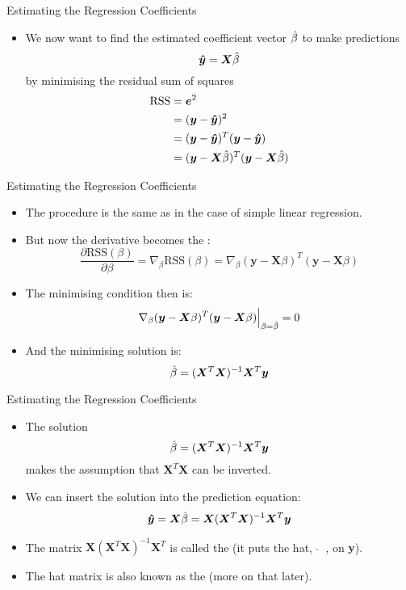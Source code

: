 \documentclass[mathserif, aspectratio=169]{beamer}
\begin{document}
\begin{frame}{Estimating the Regression Coefficients}
	\begin{itemize}
		\item We now want to find the estimated coefficient vector $\hat{\beta}$ to make predictions
			\[ \bm{\hat{y}} = \bm{X}\hat{\beta} \]
			by minimising the residual sum of squares
			\begin{align*}
				\text{RSS} &= \bm{e}^2\\
				{} &= (\bm{y} - \bm{\hat{y}})^2\\
				{} &= (\bm{y} - \bm{\hat{y}})^T(\bm{y} - \bm{\hat{y}})\\
				{} &= (\bm{y} - \bm{X}\hat{\beta})^T(\bm{y} - \bm{X}\hat{\beta})\\
			\end{align*}
	\end{itemize}
\end{frame}

\begin{frame}{Estimating the Regression Coefficients}
	\begin{itemize}
		\item The procedure is the same as in the case of simple linear regression.
		\item But now the derivative becomes the :
			\[
				\frac{\partial\text{RSS}(\beta)}{\partial\beta}
				= \nabla_{\beta} \text{RSS}(\beta)
				= \nabla_{\beta} (\bm{y} - \bm{X}\beta)^T(\bm{y} - \bm{X}\beta)
			\]
		\item The minimising condition then is:
			\[
				\nabla_{\beta} (\bm{y} - \bm{X}\beta)^T(\bm{y} - \bm{X}\beta) \Bigr\rvert_{\beta = \hat{\beta}} = 0
			\]
		\item And the minimising solution is:
			\[
				\hat{\beta} = (\bm{X}^T\bm{X})^{-1}\bm{X}^T\bm{y}
			\]
	\end{itemize}
\end{frame}

\begin{frame}{Estimating the Regression Coefficients}
	\begin{itemize}
		\item The solution
			\[
				\hat{\beta} = (\bm{X}^T\bm{X})^{-1}\bm{X}^T\bm{y}
			\]
			makes the assumption that $\bm{X}^T\bm{X}$ can be inverted.
		\item We can insert the solution into the prediction equation:
			\[
				\bm{\hat{y}} = \bm{X}\hat{\beta} = \bm{X} (\bm{X}^T\bm{X})^{-1}\bm{X}^T\bm{y}
			\]
		\item The matrix $\bm{X} (\bm{X}^T\bm{X})^{-1}\bm{X}^T$ is called the 
			(it puts the hat, $\;\bm{\hat{}}\;\;$, on $\bm{y}$).
		\item The hat matrix is also known as the  (more on that later).
	\end{itemize}
\end{frame}
\end{document}
